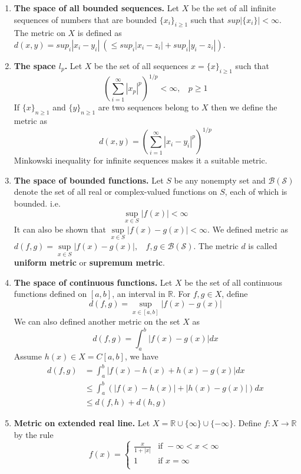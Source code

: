 \documentclass[12pt]{report}
\theoremstyle{definition}
\begin{document}
\begin{enumerate}
    \item \textbf{The space of all bounded sequences.} Let $X$ be the set of all infinite sequences of numbers that are bounded $\{x_i\}_{i \geq 1}$ such that $sup|\{x_i\}| < \infty$. The metric on $X$ is defined as $d(x,y)= sup_i|x_i - y_i| ~(\leq sup_i|x_i - z_i| + sup_i|y_i - z_i|).$
    \item \textbf{The space $l_p$.} Let $X$ be the set of all sequences $x = \{x\}_{i \geq 1}$ such that 
    $$ \left(\sum\limits_{i = 1}^{\infty} |x_p|^p\right)^{1/p} < \infty,~~~~p \geq 1$$
    If $\{x\}_{n \geq 1}$ and $\{y\}_{n \geq 1}$ are two sequences belong to $X$ then we define the metric as
    $$ d(x,y) = \left(\sum\limits_{i = 1}^{\infty} |x_i - y_i|^p\right)^{1/p}$$
    Minkowski inequality for infinite sequences makes it a suitable metric.
    \item \textbf{The space of bounded functions.} Let $S$ be any nonempty set and $\mathcal{B(S)}$ denote the set of all real or complex-valued functions on $S$, each of which is bounded. i.e. 
    $$ \sup\limits_{x \in S} |f(x)| < \infty$$
    It can also be shown that $\sup\limits_{x \in S} |f(x) - g(x)| < \infty$. We defined metric as $d(f,g) = \sup\limits_{x \in S}|f(x) - g(x)|,~~~~ f,g \in \mathcal{B(S)}$. The metric $d$ is called \textbf{uniform metric} or \textbf{supremum metric}.
    \item \textbf{The space of continuous functions.} Let $X$ be the set of all continuous functions defined on $[a,b]$, an interval in $\mathbb{R}$. For $f,g \in X$, define
    $$ d(f,g) = \sup\limits_{x\in [a,b]} |f(x) - g(x)|$$
    We can also defined another metric on the set $X$ as
    $$ d(f,g) = \int_a^b |f(x) - g(x)| dx$$
    Assume $h(x) \in X = C[a,b]$, we have
    \begin{align*}
        d(f,g) &= \int_a^b |f(x) - h(x) + h(x) - g(x)| dx\\
        &\leq \int_a^b \left(|f(x) - h(x)| + |h(x) - g(x)| \right)dx\\
        &\leq d(f,h) + d(h,g)
    \end{align*}
    \item \textbf{Metric on extended real line.} Let $X = \mathbb{R} \cup \{\infty\} \cup \{-\infty\}$. Define $f: X \to \mathbb{R}$ by the rule
    $$ f(x) = \begin{cases}
        \frac{x}{1+|x|} & \text{if } -\infty < x < \infty \\
        1 & \text{if } x = \infty\\

\end{cases}$$
\end{enumerate}
\end{document}
